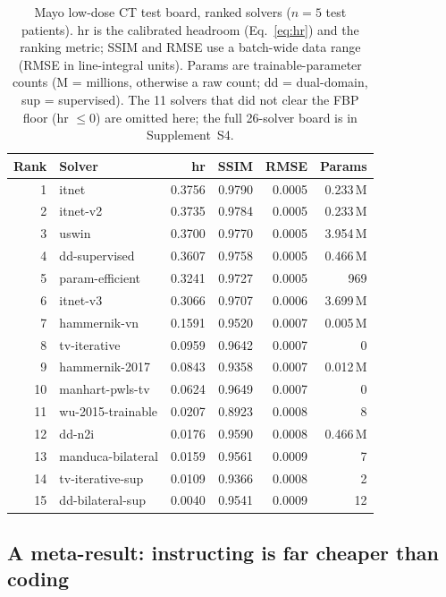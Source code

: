 \documentclass[AMA,twocolumn]{USG} %
\begin{document}
\begin{table}[t]
\caption{Mayo low-dose CT test board, ranked solvers ($n=5$ test patients). hr is the calibrated headroom (Eq.~\ref{eq:hr}) and the ranking metric; SSIM and RMSE use a batch-wide data range (RMSE in line-integral units). Params are trainable-parameter counts (M = millions, otherwise a raw count; dd = dual-domain, sup = supervised). The 11 solvers that did not clear the FBP floor (hr $\le 0$) are omitted here; the full 26-solver board is in Supplement~S4.\label{tab:mayo}}
\scriptsize
\setlength{\tabcolsep}{4pt}
\centering
\begin{tabular}{@{}rlrrrr@{}}
\toprule
\textbf{Rank} & \textbf{Solver} & \textbf{hr} & \textbf{SSIM} & \textbf{RMSE} & \textbf{Params} \\
\midrule
1  & itnet             & 0.3756 & 0.9790 & 0.0005 & 0.233\,M \\
2  & itnet-v2          & 0.3735 & 0.9784 & 0.0005 & 0.233\,M \\
3  & uswin             & 0.3700 & 0.9770 & 0.0005 & 3.954\,M \\
4  & dd-supervised     & 0.3607 & 0.9758 & 0.0005 & 0.466\,M \\
5  & param-efficient   & 0.3241 & 0.9727 & 0.0005 & 969 \\
6  & itnet-v3          & 0.3066 & 0.9707 & 0.0006 & 3.699\,M \\
7  & hammernik-vn      & 0.1591 & 0.9520 & 0.0007 & 0.005\,M \\
8  & tv-iterative      & 0.0959 & 0.9642 & 0.0007 & 0 \\
9  & hammernik-2017    & 0.0843 & 0.9358 & 0.0007 & 0.012\,M \\
10 & manhart-pwls-tv   & 0.0624 & 0.9649 & 0.0007 & 0 \\
11 & wu-2015-trainable & 0.0207 & 0.8923 & 0.0008 & 8 \\
12 & dd-n2i            & 0.0176 & 0.9590 & 0.0008 & 0.466\,M \\
13 & manduca-bilateral & 0.0159 & 0.9561 & 0.0009 & 7 \\
14 & tv-iterative-sup  & 0.0109 & 0.9366 & 0.0008 & 2 \\
15 & dd-bilateral-sup  & 0.0040 & 0.9541 & 0.0009 & 12 \\
\bottomrule
\end{tabular}
\end{table}

\subsection{A meta-result: instructing is far cheaper than coding}\label{sec:effort}
\end{document}
